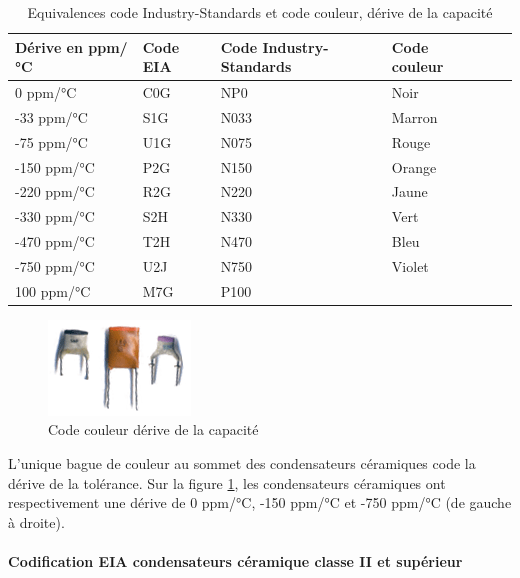 \documentclass[a4paper]{article}
\begin{document}
\begin{table}[H]
	\centering
		\begin{tabular}{|l||l|l|l|l|l|}\hline
				Dérive en ppm/°C & Code \ac{EIA} & Code Industry-Standards & Code couleur\\\hline\hline
				0 ppm/°C & C0G & NP0 & \cellcolor{black}\color{white}Noir\\\hline
				-33 ppm/°C & S1G & N033 & \cellcolor{marron}\color{white}Marron\\\hline
				-75 ppm/°C & U1G & N075 & \cellcolor{red}Rouge\\\hline
				-150 ppm/°C & P2G & N150 & \cellcolor{orange}Orange\\\hline
				-220 ppm/°C & R2G & N220 & \cellcolor{yellow}Jaune\\\hline
				-330 ppm/°C & S2H & N330 & \cellcolor{green}Vert\\\hline
				-470 ppm/°C & T2H & N470 & \cellcolor{blue}\color{white}Bleu\\\hline
				-750 ppm/°C & U2J & N750 & \cellcolor{purple}Violet	\\\hline
				100 ppm/°C & M7G & P100 & \\\hline
		\end{tabular}
	\caption{Equivalences code Industry-Standards et code couleur, dérive de la capacité
		\label{Equivalences_code_Industry-Standards_et_code_couleur_derive_de_la_capacite}}
\end{table}

\begin{figure}[H]
	\centering
	\includegraphics[scale=0.75]{Images/Code_couleur_derive_condensateurs.png}
	\caption{Code couleur dérive de la capacité
		\label{Code_couleur_derive_condensateurs}}
\end{figure}

L'unique bague de couleur au sommet des condensateurs céramiques code la dérive de la tolérance. Sur la figure \ref{Code_couleur_derive_condensateurs}, les condensateurs céramiques ont respectivement une dérive de 0 ppm/°C, -150 ppm/°C et -750 ppm/°C (de gauche à droite).

\paragraph{Codification \ac{EIA} condensateurs céramique classe II et supérieur}
\end{document}
